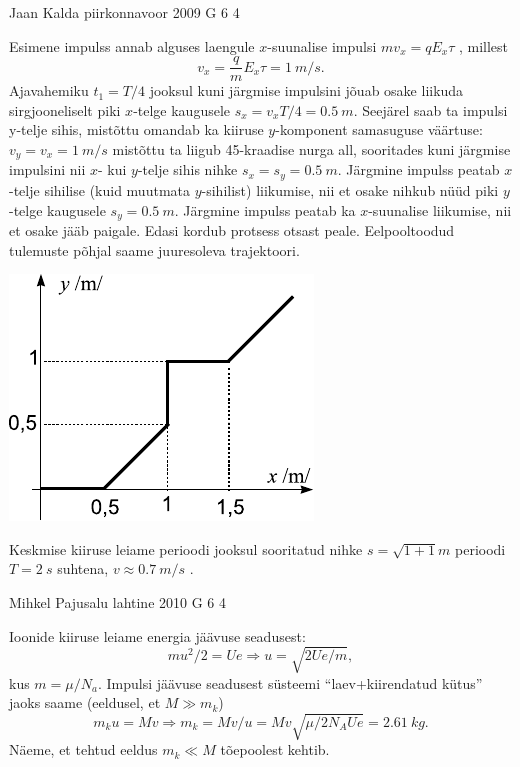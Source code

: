 \documentclass[11pt, twoside]{article}
\begin{document}
{%
{Jaan Kalda} %
{piirkonnavoor} %
{2009} %
{G 6} %
{4} %
{

\ifSolution
Esimene impulss annab alguses laengule $x$-suunalise impulsi $mv_x = qE_x\tau$ , millest
\[
v_{x}=\frac{q}{m} E_{x} \tau= \SI{1}{m/s}.
\]
Ajavahemiku $t_1 = T /4$ jooksul kuni järgmise impulsini jõuab osake liikuda sirgjooneliselt piki $x$-telge kaugusele
$s_x = v_xT /4 = \SI{0,5}{m}$. Seejärel saab ta impulsi y-telje sihis, mistõttu omandab ka kiiruse $y$-komponent
samasuguse väärtuse: $v_y = v_x = \SI{1}{m/s}$ mistõttu ta liigub \num{45}-kraadise nurga all,
sooritades kuni järgmise impulsini nii $x$- kui $y$-telje sihis nihke $s_x = s_y = \SI{0,5}{m}$. Järgmine impulss peatab $x$-telje sihilise (kuid muutmata $y$-sihilist) liikumise, nii et
osake nihkub nüüd piki $y$-telge kaugusele $s_y = \SI{0,5}{m}$. Järgmine impulss peatab ka $x$-suunalise liikumise, nii et osake jääb paigale. Edasi kordub protsess otsast
peale. Eelpooltoodud tulemuste põhjal saame juuresoleva trajektoori.

\begin{center}
	\includegraphics[width=0.6\linewidth]{2009-v2g-06-lah}
\end{center}

Keskmise kiiruse leiame perioodi jooksul sooritatud nihke $s = \sqrt{1+1}\si{m}$ perioodi $T = \SI{2}{s}$ suhtena, $v \approx \SI{0,7}{m/s}$ .
\fi
}

{Mihkel Pajusalu} %
{lahtine} %
{2010} %
{G 6} %
{4} %
{

\ifSolution
Ioonide kiiruse leiame energia jäävuse seadusest:
$$mu^2/2=Ue \Rightarrow u=\sqrt{2Ue/m},$$
kus $m=\mu/N_a$.
Impulsi jäävuse seadusest süsteemi ``laev+kiirendatud kütus'' jaoks saame (eeldusel, et $M\gg m_k$)
$$m_ku=Mv \Rightarrow m_k=Mv/u=Mv\sqrt{\mu/2N_AUe}=\SI{2,61}{kg}.$$
Näeme, et tehtud eeldus $m_k\ll M$ tõepoolest kehtib.
\fi
}

}
\end{document}
